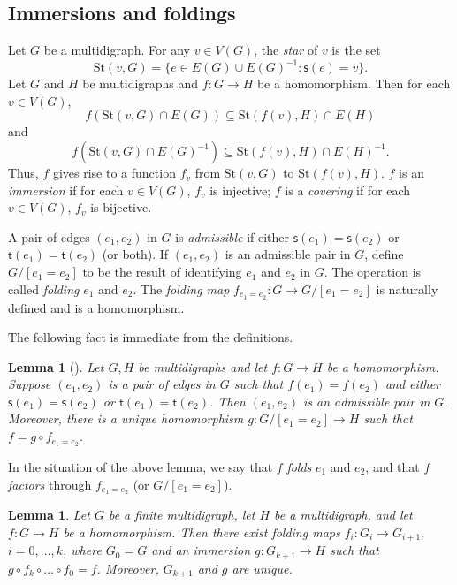 \documentclass[11pt]{amsart}
\newtheorem{lemma}[theorem]{Lemma}
\theoremstyle{definition}
\theoremstyle{definition}
\numberwithin{equation}{section}
\begin{document}
\subsection{Immersions and foldings} 

Let $G$ be a multidigraph. For any $v\in V(G)$, the {\em star} of $v$ is the set
$$ \mbox{St}(v, G)=\{e\in E(G)\cup E(G)^{-1}\colon \mathsf{s}(e)=v\}. $$
Let $G$ and $H$ be multidigraphs and $f\colon G\to H$ be a homomorphism. Then for each $v\in V(G)$, 
$$ f(\mbox{St}(v, G)\cap E(G))\subseteq \mbox{St}(f(v), H)\cap E(H)$$
and $$ f(\mbox{St}(v, G)\cap E(G)^{-1})\subseteq \mbox{St}(f(v), H)\cap E(H)^{-1}. $$
Thus, $f$ gives rise to a function $f_v$ from $\mbox{St}(v, G)$ to $\mbox{St}(f(v), H)$. $f$ is an {\em immersion} if for each $v\in V(G)$, $f_v$ is injective; $f$ is a {\em covering} if for each $v\in V(G)$, $f_v$ is bijective.

A pair of edges $(e_1, e_2)$ in $G$ is {\em admissible} if either $\mathsf{s}(e_1)=\mathsf{s}(e_2)$ or $\mathsf{t}(e_1)=\mathsf{t}(e_2)$ (or both). If $(e_1,e_2)$ is an admissible pair in $G$, define $G/[e_1=e_2]$ to be the result of identifying $e_1$ and $e_2$ in $G$. The operation is called {\em folding} $e_1$ and $e_2$. The {\em folding map} $f_{e_1=e_2}\colon G\to G/[e_1=e_2]$ is naturally defined and is a homomorphism. 

The following fact is immediate from the definitions.

\begin{lemma}[{\cite[3.3]{St83}}] Let $G, H$ be multidigraphs and let $f\colon G\to H$ be a homomorphism. Suppose $(e_1, e_2)$ is a pair of edges in $G$ such that $f(e_1)=f(e_2)$ and either $\mathsf{s}(e_1)=\mathsf{s}(e_2)$ or $\mathsf{t}(e_1)=\mathsf{t}(e_2)$. Then $(e_1, e_2)$ is an admissible pair in $G$. Moreover, there is a unique homomorphism $g\colon G/[e_1=e_2]\to H$ such that $f=g\circ f_{e_1=e_2}$. 
\end{lemma}


In the situation of the above lemma, we say that $f$ {\em folds} $e_1$ and $e_2$, and that $f$ {\em factors} through $f_{e_1=e_2}$ (or $G/[e_1=e_2]$).

\begin{lemma}\label{lem:folds} Let $G$ be a finite multidigraph, let $H$ be a multidigraph, and let $f\colon G\to H$ be a homomorphism. Then there exist folding maps $f_i\colon G_i\to G_{i+1}$, $i=0,\dots, k$, where $G_0=G$ and an immersion $g\colon G_{k+1}\to H$ such that $g\circ f_k\circ \dots \circ f_0=f$. Moreover, $G_{k+1}$ and $g$ are unique.
\end{lemma}
\end{document}
